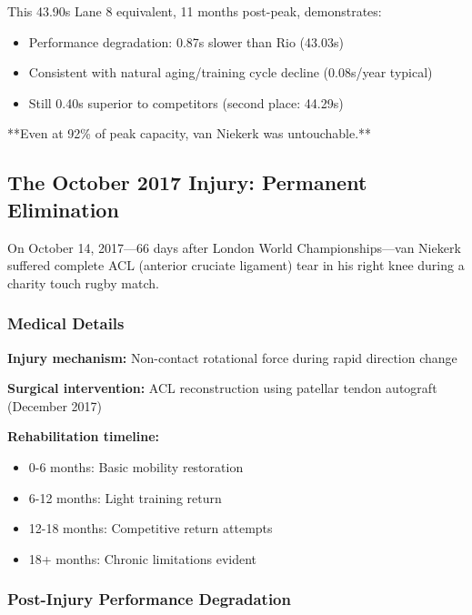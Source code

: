 This 43.90s Lane 8 equivalent, 11 months post-peak, demonstrates:
\begin{itemize}
    \item Performance degradation: 0.87s slower than Rio (43.03s)
    \item Consistent with natural aging/training cycle decline (0.08s/year typical)
    \item Still 0.40s superior to competitors (second place: 44.29s)
\end{itemize}

**Even at 92\% of peak capacity, van Niekerk was untouchable.**

\subsection{The October 2017 Injury: Permanent Elimination}

On October 14, 2017—66 days after London World Championships—van Niekerk suffered complete ACL (anterior cruciate ligament) tear in his right knee during a charity touch rugby match.

\subsubsection{Medical Details}

\textbf{Injury mechanism:} Non-contact rotational force during rapid direction change

\textbf{Surgical intervention:} ACL reconstruction using patellar tendon autograft (December 2017)

\textbf{Rehabilitation timeline:}
\begin{itemize}
    \item 0-6 months: Basic mobility restoration
    \item 6-12 months: Light training return
    \item 12-18 months: Competitive return attempts
    \item 18+ months: Chronic limitations evident
\end{itemize}

\subsubsection{Post-Injury Performance Degradation}

